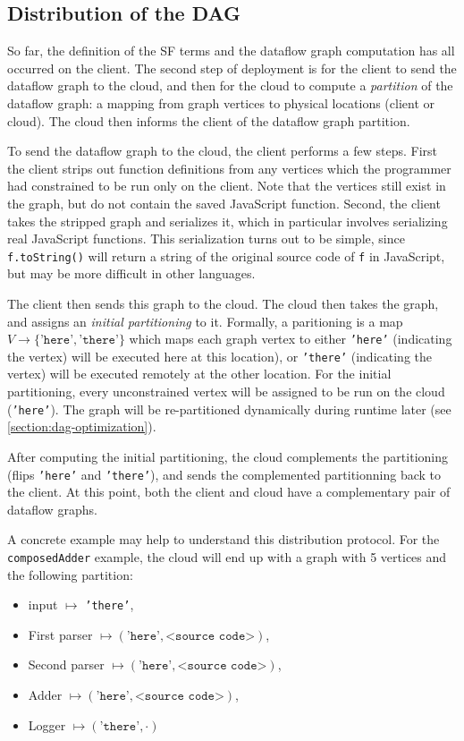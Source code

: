 \documentclass[10pt,sigplan,screen,nonacm]{acmart}
\begin{document}
\subsection{Distribution of the DAG}
\label{section:dag-distribution}

So far, the definition of the SF terms and the dataflow graph
computation has all occurred on the client. The second
step of deployment is for the client to send the dataflow graph to the
cloud, and then for the cloud to compute a \emph{partition} of the dataflow
graph: a mapping from graph vertices to physical locations (client or cloud).
The cloud then informs the client of the dataflow graph partition.

To send the dataflow graph to the cloud, the client performs a few steps.
First the client strips out function definitions from any vertices 
which the programmer had constrained to be run only on the client.
Note that the vertices still exist in the graph, but do not contain
the saved JavaScript function. Second, the client takes the stripped
graph and serializes it, which in particular involves serializing
real JavaScript functions. This serialization turns out to be simple,
since \texttt{f.toString()} will return a string of the original source
code of \texttt{f} in JavaScript, but may be more difficult in other languages.

The client then sends this graph to the cloud. The cloud
then takes the graph, and assigns an \emph{initial partitioning} to it.
Formally, a paritioning is a map $V \to \{ \texttt{'here'}, \texttt{'there'} \}$
which maps each graph vertex to either \texttt{'here'} (indicating the vertex)
will be executed here at this location), or \texttt{'there'} (indicating the vertex)
will be executed remotely at the other location. For the initial partitioning,
every unconstrained vertex will be assigned to be run on the cloud (\texttt{'here'}).
The graph will be re-partitioned dynamically during runtime later (see \cref{section:dag-optimization}).

After computing the initial partitioning, the cloud complements the partitioning
(flips \texttt{'here'} and \texttt{'there'}), and sends the complemented partitionning
back to the client. At this point, both the client and cloud have a complementary
pair of dataflow graphs.

A concrete example may help to understand this distribution protocol.
For the \texttt{composedAdder} example, the cloud will end up with a graph
with 5 vertices and the following partition: 
\begin{itemize}
	\item input $\mapsto$ \texttt{'there'},
	\item First parser $\mapsto (\texttt{'here'}, \texttt{<source code>})$,
	\item Second parser $\mapsto (\texttt{'here'}, \texttt{<source code>})$,
	\item Adder $\mapsto (\texttt{'here'}, \texttt{<source code>})$,
	\item Logger $\mapsto (\texttt{'there'}, \cdot)$
\end{itemize}
\end{document}
